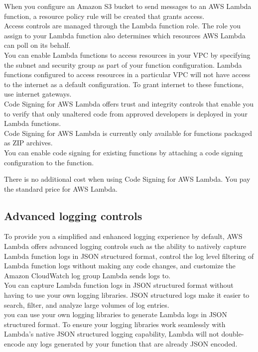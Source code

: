 \documentclass[12pt, letterpaper, twoside]{article}
\begin{document}
When you configure an Amazon S3 bucket to send messages to an AWS Lambda function, a resource policy rule will be created 
that grants access.\\

Access controls are managed through the Lambda function role. The role you assign to your Lambda function also determines 
which resources AWS Lambda can poll on its behalf.\\

You can enable Lambda functions to access resources in your VPC by specifying the subnet and security group as part of your 
function configuration. Lambda functions configured to access resources in a particular VPC will not have access to the 
internet as a default configuration. To grant internet to these functions, use internet gateways.\\

Code Signing for AWS Lambda offers trust and integrity controls that enable you to verify that only unaltered code from 
approved developers is deployed in your Lambda functions.\\
Code Signing for AWS Lambda is currently only available for functions packaged as ZIP archives.\\
You can enable code signing for existing functions by attaching a code signing configuration to the function.

There is no additional cost when using Code Signing for AWS Lambda. You pay the standard price for AWS Lambda.\\

\subsection{Advanced logging controls}
To provide you a simplified and enhanced logging experience by default, AWS Lambda offers advanced logging controls such 
as the ability to natively capture Lambda function logs in JSON structured format, control the log level filtering of 
Lambda function logs without making any code changes, and customize the Amazon CloudWatch log group Lambda sends logs to.\\

You can capture Lambda function logs in JSON structured format without having to use your own logging libraries. 
JSON structured logs make it easier to search, filter, and analyze large volumes of log entries.\\

you can use your own logging libraries to generate Lambda logs in JSON structured format. To ensure your logging 
libraries work seamlessly with Lambda’s native JSON structured logging capability, Lambda will not double-encode 
any logs generated by your function that are already JSON encoded.\\
\end{document}
